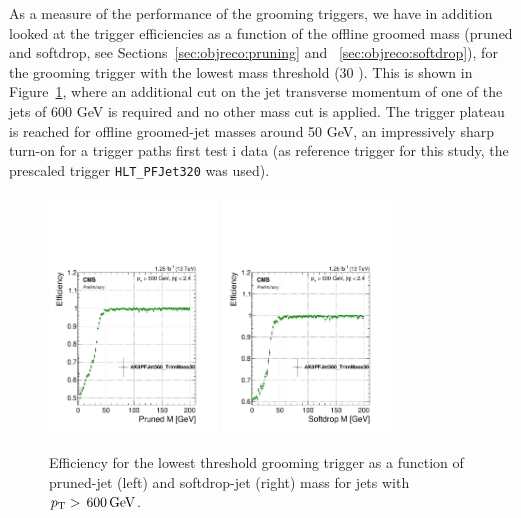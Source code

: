 As a measure of the performance of the grooming triggers, we have in addition looked at the trigger efficiencies as a function of the offline groomed mass (pruned and softdrop, see Sections~\ref{sec:objreco:pruning} and ~\ref{sec:objreco:softdrop}), for the grooming trigger with the lowest mass threshold (30 \GeV). This is shown in Figure~\ref{fig:searchI:grooming-mj-trigger}, where an additional cut on the jet transverse momentum of one of the jets of 600 GeV is required and no other mass cut is applied. The trigger plateau is reached for offline groomed-jet masses around 50 GeV, an impressively sharp turn-on for a trigger paths first test i data (as reference trigger for this study, the prescaled trigger \texttt{HLT\_PFJet320} was used). 

\begin{figure}[h!]
\centering
\includegraphics[width=0.4\textwidth]{figures/analysis/search1/AN-15-211//triggereff-prunedmass600.pdf}
\includegraphics[width=0.4\textwidth]{figures/analysis/search1/AN-15-211//triggereff-sdmass.pdf}
\caption{Efficiency for the lowest threshold grooming trigger as a function of pruned-jet (left) and softdrop-jet (right) mass for jets with $p_{\mathrm{T}} > \text{\,600}{\ensuremath{\,\text{Ge\hspace{-.08em}V}}}$.}
\label{fig:searchI:grooming-mj-trigger}
\end{figure}


